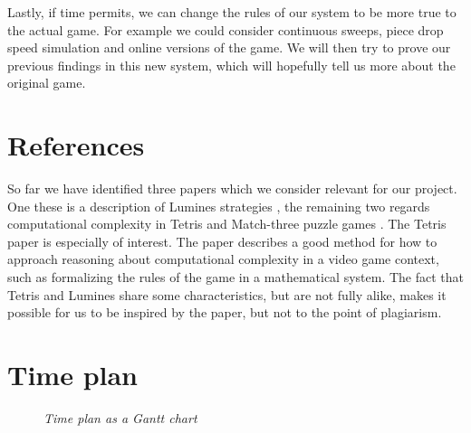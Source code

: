 \documentclass[a4paper,10pt]{article}
\begin{document}
Lastly, if time permits, we can change the rules of our system to be more true to the actual game. For example we could consider continuous sweeps, piece drop speed simulation and online versions of the game. We will then try to prove our previous findings in this new system, which will hopefully tell us more about the original game.

\section{References}
So far we have identified three papers which we consider relevant for our project. One these is a description of Lumines strategies \cite{lumines}, the remaining two regards computational complexity in Tetris \cite{tetris} and Match-three puzzle games \cite{candy}. The Tetris paper is especially of interest. The paper describes a good method for how to approach reasoning about computational complexity in a video game context, such as formalizing the rules of the game in a mathematical system. The fact that Tetris and Lumines share some characteristics, but are not fully alike, makes it possible for us to be inspired by the paper, but not to the point of plagiarism.

\newcommand\Dganttbar[4]{%
  \ganttbar{#1}{#3}{#4}\ganttbar[inline,bar label font=\footnotesize]{#2}{#3}{#4}
}

\section{Time plan}
 \begin{figure}[H]
    \centering
    \resizebox{\textwidth}{!} {
    }
    \textit{Time plan as a Gantt chart}
\end{figure}
\printbibliography
\end{document}
